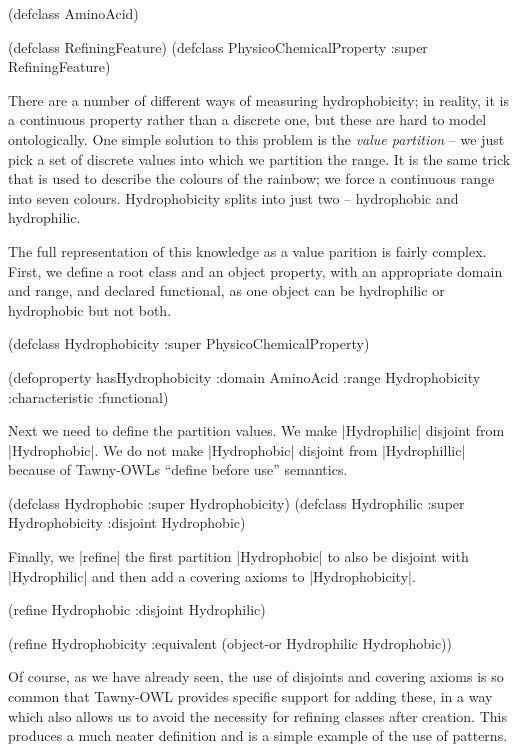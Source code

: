 \begin{tawny}
(defclass AminoAcid)

(defclass RefiningFeature)
(defclass PhysicoChemicalProperty :super RefiningFeature)
\end{tawny}

There are a number of different ways of measuring hydrophobicity; in reality,
it is a continuous property rather than a discrete one, but these are hard to
model ontologically. One simple solution to this problem is the \emph{value
  partition} -- we just pick a set of discrete values into which we partition
the range. It is the same trick that is used to describe the colours of the
rainbow; we force a continuous range into seven colours. Hydrophobicity splits
into just two -- hydrophobic and hydrophilic.

The full representation of this knowledge as a value parition is fairly
complex. First, we define a root class and an object property, with
an appropriate domain and range, and declared functional, as one object can be
hydrophilic or hydrophobic but not both.

\begin{tawnyexample}
(defclass Hydrophobicity :super PhysicoChemicalProperty)

(defoproperty hasHydrophobicity :domain AminoAcid
  :range Hydrophobicity :characteristic :functional)
\end{tawnyexample}

Next we need to define the partition values. We make |Hydrophilic|
disjoint from |Hydrophobic|. We do not make |Hydrophobic| disjoint
from |Hydrophillic| because of Tawny-OWLs ``define before use''
semantics.

\begin{tawnyexample}
(defclass Hydrophobic :super Hydrophobicity)
(defclass Hydrophilic :super Hydrophobicity :disjoint Hydrophobic)
\end{tawnyexample}

Finally, we |refine| the first partition |Hydrophobic| to also be disjoint
with |Hydrophilic| and then add a covering axioms to |Hydrophobicity|.

\begin{tawnyexample}
(refine Hydrophobic
  :disjoint Hydrophilic)

(refine Hydrophobicity
  :equivalent (object-or Hydrophilic Hydrophobic))
\end{tawnyexample}

Of course, as we have already seen, the use of disjoints and covering
axioms is so common that Tawny-OWL provides specific support for
adding these, in a way which also allows us to avoid the necessity for
refining classes after creation. This produces a much neater
definition and is a simple example of the use of patterns.

